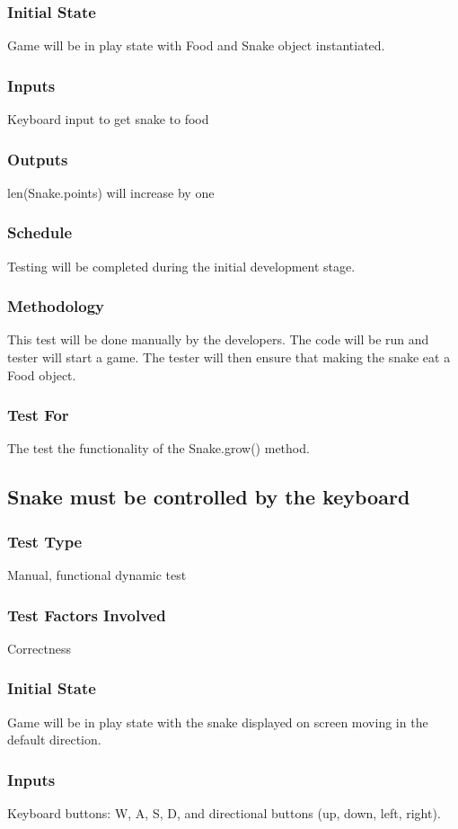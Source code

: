 \documentclass[12pt]{article}
\begin{document}
\subsubsection*{Initial State}
Game will be in play state with Food and Snake object instantiated.
\subsubsection*{Inputs}
Keyboard input to get snake to food
\subsubsection*{Outputs}
len(Snake.points) will increase by one
\subsubsection*{Schedule}
Testing will be completed during the initial development stage.
\subsubsection*{Methodology}
This test will be done manually by the developers. The code will be run and tester will start a game. The tester will then ensure that making the snake eat a Food object.
\subsubsection*{Test For}
The test the functionality of the Snake.grow() method. \newline

\noindent
\subsection{Snake must be controlled by the keyboard}
\subsubsection*{Test Type}
Manual, functional dynamic test
\subsubsection*{Test Factors Involved}
Correctness
\subsubsection*{Initial State}
Game will be in play state with the snake displayed on screen moving in the default direction.
\subsubsection*{Inputs}
Keyboard buttons: W, A, S, D, and directional buttons (up, down, left, right). 
\end{document}

